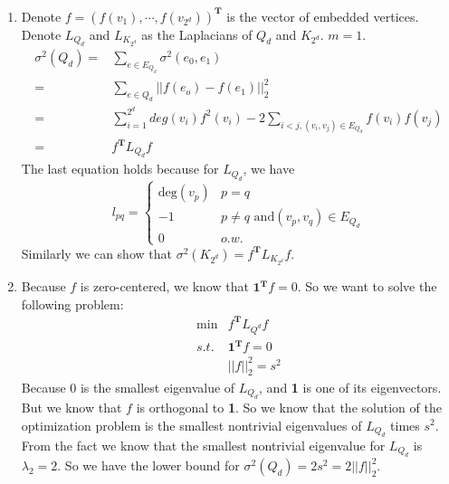 \documentclass[twoside,11pt]{homework}
\begin{document}
\begin{enumerate}
    
    \item
    Denote $f = (f(v_1),\cdots,f(v_{2^d}))^\mathbf{T}$ is the vector of embedded vertices. Denote $L_{Q_d}$ and $L_{K_{2^d}}$ as the Laplacians of $Q_d$ and $K_{2^d}$. $m=1$.
    \begin{align*}
        \sigma^2(Q_d) =& \sum_{e \in E_{Q_d}}\sigma^2(e_0,e_1)\\
        =& \sum_{e \in Q_d} ||f(e_o)-f(e_1)||_2^2\\
        =& \sum_{i = 1}^{2^d} deg(v_i) f^2(v_i) - 2\sum_{i<j, (v_i,v_j)\in E_{Q_d}}f(v_i)f(v_j)\\
        =& f^\mathbf{T} L_{Q_d}f
    \end{align*}
    The last equation holds because for $L_{Q_d}$, we have
    \begin{equation*}
        l_{pq} = 
        \begin{cases}
        \text{deg}(v_p)& p=q\\
        -1& p \neq q \text{ and} (v_p,v_q) \in E_{Q_d}\\
        0& o.w.
        \end{cases}
    \end{equation*}
    Similarly we can show that $\sigma^2(K_{2^d}) = f^\mathbf{T} L_{K_{2^d}}f$.
    
    \item
    Because $f$ is zero-centered, we know that $\textbf{1}^\textbf{T}f=0$. So we want to solve the following problem:
    \begin{align*}
        \min &f^\textbf{T}L_{Q^d}f\\
    s.t.&\textbf{1}^\textbf{T}f=0 \\
    &||f||_2^2 = s^2
    \end{align*}
    Because 0 is the smallest eigenvalue of $L_{Q_d}$, and \textbf{1} is one of its eigenvectors. But we know that $f$ is orthogonal to \textbf{1}. So we know that the solution of the optimization problem is the smallest nontrivial eigenvalues of $L_{Q_d}$ times $s^2$. From the fact we know that the smallest nontrivial eigenvalue for $L_{Q_d}$ is $\lambda_2=2$. So we have the lower bound for $\sigma^2(Q_d)=2s^2 = 2||f||_2^2$.
    

\end{enumerate}
\end{document}
